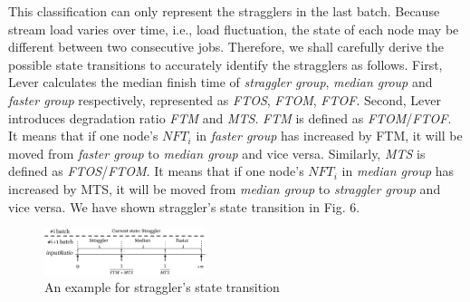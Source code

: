 \documentclass[10pt,conference,compsocconf,letterpaper]{IEEEtran}
\begin{document}
  This classification can only represent the stragglers in the last batch. Because stream load varies over time, i.e., load fluctuation, the state of each node may be different between two consecutive jobs. Therefore, we shall carefully derive the possible state transitions to accurately identify the stragglers as follows. First, Lever calculates the median finish time of \emph{straggler group}, \emph{median group} and \emph{faster group} respectively, represented as \emph{FTOS}, \emph{FTOM}, \emph{FTOF}. Second, Lever introduces degradation ratio \emph{FTM} and \emph{MTS}. \emph{FTM} is defined as \emph{FTOM}/\emph{FTOF}. It means that if one node's $NFT_i$ in \emph{faster group} has increased by FTM, it will be moved from \emph{faster group} to \emph{median group} and vice versa. Similarly, \emph{MTS} is defined as \emph{FTOS}/\emph{FTOM}. It means that if one node's $NFT_i$ in \emph{median group} has increased by MTS, it will be moved from \emph{median group} to \emph{straggler group} and vice versa. We have shown straggler's state transition in Fig. 6.
  \begin{figure}[htbp]
    \centering
    \includegraphics[width=0.42\textwidth]{FigureI2}
    \caption{An example for straggler's state transition}
    \label{Fig. 6:}
  \end{figure}
\end{document}
